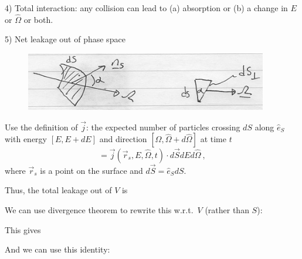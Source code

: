 \documentclass[12pt]{article}
\newif\ifeqns
\newcommand{\vOmega}{\ensuremath{\hat{\Omega}}}
\begin{document}
4) Total interaction: any collision can lead to (a) absorption or (b) a change in $E$ or $\vOmega$ or both.
\ifeqns
\[\boxed{\Bigl[\int_V d^3r \Sigma_t(E) v n(\vec{r}, E, \vOmega, t) \Bigr] dE d\vOmega }\]
\else
\vspace*{3em}
\fi

5) Net leakage out of phase space

\begin{figure}[h!]
\begin{center}
\includegraphics[height=1in]{../figs/DifferentialArea}
\end{center}
\end{figure}

Use the definition of $\vec{j}$: the expected number of particles crossing $dS$ along $\hat{e}_S$ with energy $[E, E + dE]$ and direction $[\vOmega, \vOmega + d\vOmega]$ at time $t$  
%
\[= \vec{j}(\vec{r}_s, E, \vOmega, t) \cdot d\vec{S} dE d\vOmega\:,\]
%
where $\vec{r}_s$ is a point on the surface and $d\vec{S} = \hat{e}_S dS$.

Thus, the total leakage out of $V$ is
\ifeqns
\[\Bigl[\int_S \vec{j}(\vec{r}_s, E, \vOmega, t) \cdot d\vec{S} \Bigr] dE d\vOmega\:. \]
\else
\vspace*{3em}
\fi

We can use divergence theorem to rewrite this w.r.t.\ $V$ (rather than $S$):
\ifeqns
\[\int_S \hat{e}_S \cdot \vec{F} (\vec{r}) dS = \int_V \nabla \cdot \vec{F} (\vec{r}) dV\]
\else
\vspace*{3em}
\fi

This gives
\ifeqns
\[\Bigl[\int_V d^3r \: \nabla \cdot \bigl( \underbrace{\vec{j}(\vec{r}_s, E, \vOmega, t)}_{=\vec{v}n = v \vOmega n} \bigr) \Bigr] dE d\vOmega \]
\else
\vspace*{3em}
\fi
%
And we can use this identity:
\ifeqns
\begin{align}
%
\vOmega \cdot (\nabla f) &= \nabla \cdot \vOmega f \text{ because }\vOmega\text{ is not a function.} \nonumber\\
\nabla \cdot \vOmega f &= f(\underbrace{\nabla \cdot \vOmega}_{0}) + \vOmega \cdot (\nabla f) \nonumber
\end{align}
%
\[\therefore \:\: \boxed{\Bigl[\int_V d^3r \: \vOmega \cdot \nabla \bigl(v n(\vec{r}_s, E, \vOmega, t) \bigr) \Bigr] dE d\vOmega }\]
\else
\vspace*{5em}
\fi
\end{document}
